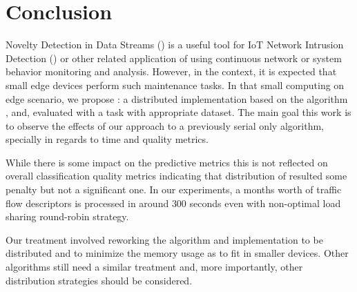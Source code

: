 
\section{Conclusion} 
\label{sec:conclusion}


Novelty Detection in Data Streams (\nd) is a useful tool for IoT Network
Intrusion Detection (\nids) or other related application of \nd using continuous
network or system behavior monitoring and analysis.
However, in the \iot context, it is expected that small edge devices perform
such maintenance tasks.
In that small computing on edge scenario, we propose \mfog: a distributed \nd
implementation based on the \nd algorithm \minas, and, evaluated with a \nids
task with appropriate dataset.
The main goal this work is to observe the effects of our approach to a
previously serial only algorithm, specially in regards to time and quality
metrics.


While there is some impact on the predictive metrics this is not reflected on
overall classification quality metrics indicating that distribution of \minas
resulted some penalty but not a significant one.
In our experiments, a months worth of traffic flow descriptors is processed in
around $300$ seconds even with non-optimal load sharing round-robin strategy.

Our treatment involved reworking the algorithm and implementation to be
distributed and to minimize the memory usage as to fit in smaller devices.
Other algorithms still need a similar treatment and, more importantly, other
distribution strategies should be considered.


